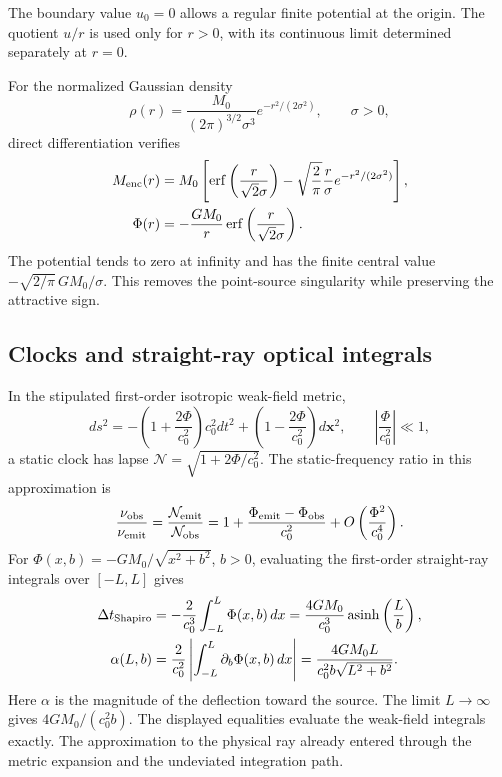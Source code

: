 The boundary value $u_0=0$ allows a regular finite potential at the
origin. The quotient $u/r$ is used only for $r>0$, with its continuous
limit determined separately at $r=0$.

For the normalized Gaussian density
\[
 \rho(r)=\frac{M_0}{(2\pi)^{3/2}\sigma^3}e^{-r^2/(2\sigma^2)},
 \qquad \sigma>0,
\]
direct differentiation verifies
\begin{align*}
 M_{\rm enc}(r)&=M_0\left[
 \operatorname{erf}\left(\frac r{\sqrt2\sigma}\right)
 -\sqrt{\frac2\pi}\frac r\sigma e^{-r^2/(2\sigma^2)}\right],\\
 \Phi(r)&=-\frac{GM_0}{r}
 \operatorname{erf}\left(\frac r{\sqrt2\sigma}\right).
\end{align*}
The potential tends to zero at infinity and has the finite central
value $-\sqrt{2/\pi}\,GM_0/\sigma$. This removes the point-source
singularity while preserving the attractive sign.

\subsection{Clocks and straight-ray optical integrals}

In the stipulated first-order isotropic weak-field metric,
\[
 ds^2=-\left(1+\frac{2\Phi}{c_0^2}\right)c_0^2dt^2
       +\left(1-\frac{2\Phi}{c_0^2}\right)d\mathbf x^2,
 \qquad \left|\frac{\Phi}{c_0^2}\right|\ll1,
\]
a static clock has lapse $\mathcal N=\sqrt{1+2\Phi/c_0^2}$.
The static-frequency ratio in this approximation is
\[
 \frac{\nu_{\rm obs}}{\nu_{\rm emit}}
 =\frac{\mathcal N_{\rm emit}}{\mathcal N_{\rm obs}}
 =1+\frac{\Phi_{\rm emit}-\Phi_{\rm obs}}{c_0^2}
 +O\left(\frac{\Phi^2}{c_0^4}\right).
\]
For $\Phi(x,b)=-GM_0/\sqrt{x^2+b^2}$, $b>0$, evaluating the
first-order straight-ray integrals over $[-L,L]$ gives
\begin{align*}
 \Delta t_{\rm Shapiro}
 &=-\frac2{c_0^3}\int_{-L}^L\Phi(x,b)\,dx
 =\frac{4GM_0}{c_0^3}\operatorname{asinh}\left(\frac Lb\right),\\
 \alpha(L,b)
 &=\frac2{c_0^2}\left|\int_{-L}^L\partial_b\Phi(x,b)\,dx\right|
 =\frac{4GM_0L}{c_0^2b\sqrt{L^2+b^2}}.
\end{align*}
Here $\alpha$ is the magnitude of the deflection toward the source.
The limit $L\to\infty$ gives $4GM_0/(c_0^2b)$. The displayed
equalities evaluate the weak-field integrals exactly. The approximation
to the physical ray already entered through the metric expansion and
the undeviated integration path.




